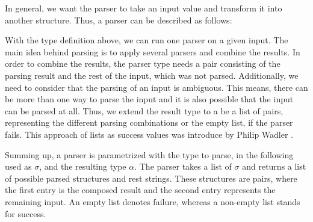\documentclass[%
	latex,%
	a4paper,%
	oneside,%
	chapterprefix,%
	headsepline,%
	12pt%
]{scrbook}
\newcommand{\Conid}[1]{\mathit{#1}}
\def\resethooks{%
  \global\let\SaveRestoreHook\empty
  \global\let\ColumnHook\empty}
\let\hspre\empty
\let\hspost\empty
\begin{document}
In general, we want the parser to take an input value and transform it
into another structure. Thus, a parser can be described as
follows:

\begin{hscode}\SaveRestoreHook
\column{B}{@{}>{\hspre}l<{\hspost}@{}}%
\column{E}{@{}>{\hspre}l<{\hspost}@{}}%
\>[B]{}\;\Conid{Parser}\;\sigma \;\alpha \mathrel{=}\sigma \to \alpha {}\<[E]%
\ColumnHook
\end{hscode}\resethooks

With the type definition above, we can run one parser on a given
input. %
The main idea behind parsing is to apply several parsers and combine
the results. %
In order to combine the results, the parser type needs a pair consisting of the
parsing result and the rest of the input, which was not parsed. %
Additionally, we need to consider that the parsing of an input is
ambiguous. %
This means, there can be more than one way to parse the input and it
is also possible that the input can be parsed at all. %
Thus, we extend the result type to a be a list of pairs, representing
the different parsing combinations or the empty list, if the parser
fails. %
This approach of lists as success values was introduce by Philip
Wadler \cite{successlist}.

\resethooks

Summing up, a parser is parametrized with the type to parse, in the
following used as \ensuremath{\sigma }, and the resulting type \ensuremath{\alpha }. %
The parser takes a list of \ensuremath{\sigma } and returns a list of
possible parsed structures and rest strings. %
These structures are pairs, where the first entry is the composed
result and the second entry represents the remaining input. %
An empty list denotes failure, whereas a non-empty list stands for
success. %

\end{document}
